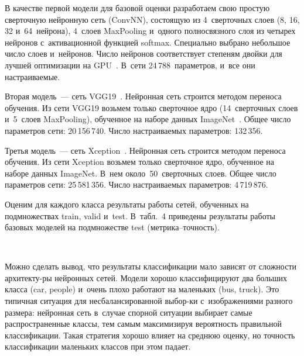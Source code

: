 \begin{multicols}{2}
  В качестве первой модели для базовой оценки разработаем свою прос\-тую 
сверточную нейронную сеть (ConvNN), со\-сто\-ящую из 4~сверточных слоев (8, 
16, 32 и~64~нейрона), 4~слоев MaxPooling и~одного полносвязного слоя из 
четырех нейронов с~активационной функцией softmax. Специально выбрано 
небольшое чис\-ло слоев и~нейронов. Чис\-ло нейронов соответствует степеням 
двой\-ки для лучшей оптимизации на GPU~\cite{7-ark}.  
В~сети 24\,788~па\-ра\-мет\-ров, и~все они на\-стра\-и\-ва\-емые.
  
  Вторая модель~--- сеть VGG19~\cite{9-ark}. Нейронная сеть строится 
методом переноса обуче\-ния. Из сети VGG19 возь\-мем только сверточное ядро 
(14~сверточных слоев и~5~слоев MaxPooling), обучен\-ное на наборе данных 
ImageNet~\cite{6-ark}. Общее чис\-ло па\-ра\-мет\-ров сети: 20\,156\,740. Чис\-ло 
на\-стра\-и\-ва\-емых па\-ра\-мет\-ров: 132\,356.
  
  Третья модель~--- сеть Xception~\cite{9-ark}. Нейронная сеть строится 
методом переноса обучения. Из сети Xception возьмем только сверточное ядро, 
обучен\-ное на наборе данных ImageNet. В~нем около~50~сверточных слоев. 
Общее чис\-ло па\-ра\-мет\-ров сети: 25\,581\,356. Чис\-ло на\-стра\-и\-ва\-емых па\-ра\-мет\-ров: 
4\,719\,876.
  
  Оценим для каждого класса результаты работы сетей, обучен\-ных на 
подмножествах train, valid и~test. В~табл.~4 приведены результаты работы 
базовых моделей на подмножестве test (мет\-ри\-ка--точ\-ность).


  
  \begin{figure*}[b] %
\vspace*{1pt}
\begin{center}
   \mbox{%
\epsfxsize=115.052mm
}
\end{center}
\vspace*{-9pt}
\end{figure*}
  
  Можно сделать вывод, что результаты классификации мало зависят от 
слож\-ности архитекту-\linebreak ры нейронных сетей. Модели хорошо классифицируют два 
больших класса (car, people) и~очень плохо работают на маленьких (bus, truck). 
Это типичная ситуация для несбалансированной выбор-\linebreak ки с~изоб\-ра\-же\-ни\-ями 
разного размера: нейронная сеть в~случае спорной ситуации выбирает самые 
\mbox{распространенные} классы, тем самым максимизируя ве\-ро\-ят\-ность правильной 
классификации. Такая стратегия хорошо влияет на сред\-нюю оценку, но 
точ\-ность классификации маленьких классов при этом па\-дает.


\end{multicols}
